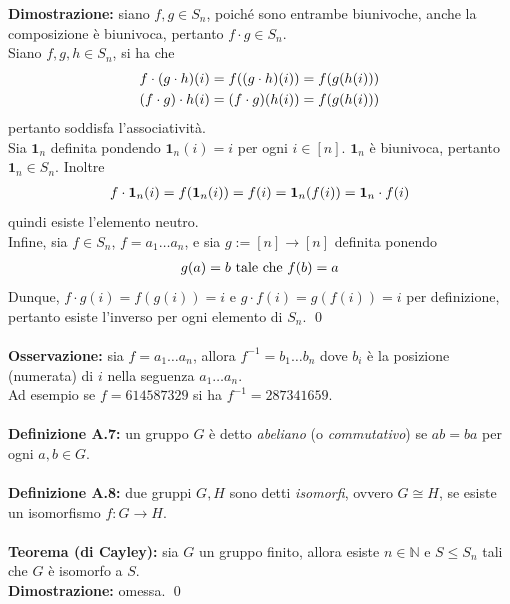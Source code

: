 \documentclass{article}
\begin{document}
\textbf{Dimostrazione:} siano $f, g \in S_n$, poiché sono entrambe biunivoche, anche la composizione è biunivoca, pertanto $f \cdot g \in S_n$. \\
Siano $f, g, h \in S_n$, si ha che
\begin{gather}
    f \cdot (g \cdot h)(i) = f((g \cdot h)(i)) = f(g(h(i))) \notag \\
    (f \cdot g) \cdot h(i) = (f \cdot g)(h(i)) = f(g(h(i))) \notag
\end{gather}
pertanto soddisfa l'associatività. \\
Sia $\mathbf{1}_n$ definita pondendo $\mathbf{1}_n(i) = i$ per ogni $i \in [n]$. $\mathbf{1}_n$ è biunivoca, pertanto $\mathbf{1}_n \in S_n$. Inoltre
\begin{gather}
    f \cdot \mathbf{1}_n (i) = f(\mathbf{1}_n(i)) = f(i) = \mathbf{1}_n (f(i)) = \mathbf{1}_n \cdot f (i) \notag
\end{gather}
quindi esiste l'elemento neutro. \\
Infine, sia $f \in S_n$, $f = a_1 \dots a_n$, e sia $g := [n] \longrightarrow [n]$ definita ponendo
\begin{gather}
    g(a) = b \text{ tale che } f(b) = a \notag
\end{gather}
Dunque, $f \cdot g (i) = f(g(i)) = i$ e $g \cdot f (i) = g(f(i)) = i$ per definizione, pertanto esiste l'inverso per ogni elemento di $S_n$. \qed \\ \\
\textbf{Osservazione:} sia $f = a_1 \dots a_n$, allora $f^{-1} = b_1 \dots b_n$ dove $b_i$ è la posizione (numerata) di $i$ nella seguenza $a_1 \dots a_n$. \\
Ad esempio se $f = 614587329$ si ha $f^{-1} = 287341659$. \\ \\
\textbf{Definizione A.7:} un gruppo $G$ è detto \textit{abeliano} (o \textit{commutativo}) se $ab = ba$ per ogni $a, b \in G$. \\ \\
\textbf{Definizione A.8:} due gruppi $G, H$ sono detti \textit{isomorfi}, ovvero $G \cong H$, se esiste un isomorfismo $f : G \longrightarrow H$. \\ \\
\textbf{Teorema (di Cayley):} sia $G$ un gruppo finito, allora esiste $n \in \mathbb{N}$ e $S \leq S_n$ tali che $G$ è isomorfo a $S$. \\

\textbf{Dimostrazione:} omessa. \qed
\newpage
\end{document}
